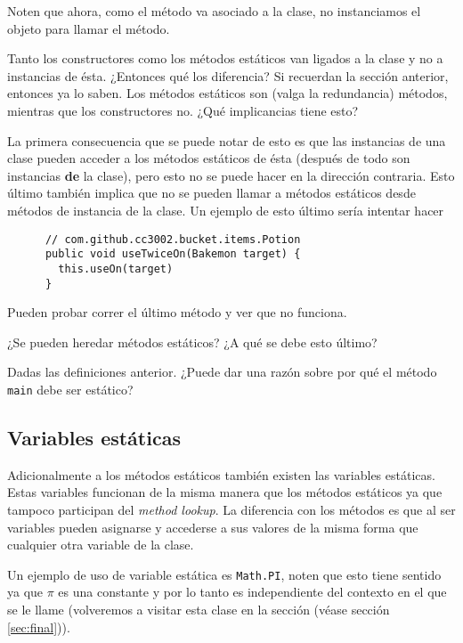     Noten que ahora, como el método va asociado a la clase, no instanciamos el objeto para llamar el
    método.
    
    Tanto los constructores como los métodos estáticos van ligados a la clase y no a instancias de
    ésta.
    ¿Entonces qué los diferencia?
    Si recuerdan la sección anterior, entonces ya lo saben.
    Los métodos estáticos son (valga la redundancia) métodos, mientras que los constructores no.
    ¿Qué implicancias tiene esto?

    La primera consecuencia que se puede notar de esto es que las instancias de una clase pueden
    acceder a los métodos estáticos de ésta (después de todo son instancias \textbf{de} la clase),
    pero esto no se puede hacer en la dirección contraria.
    Esto último también implica que no se pueden llamar a métodos estáticos desde métodos de 
    instancia de la clase.
    Un ejemplo de esto último sería intentar hacer
    
    \begin{verbatim}
      // com.github.cc3002.bucket.items.Potion
      public void useTwiceOn(Bakemon target) {
        this.useOn(target)
      }
    \end{verbatim}

    Pueden probar correr el último método y ver que no funciona.

    \begin{exercise}
      ¿Se pueden heredar métodos estáticos?
      ¿A qué se debe esto último?
    \end{exercise}
    
    \begin{exercise}
      Dadas las definiciones anterior. 
      ¿Puede dar una razón sobre por qué el método \texttt{main} debe ser estático?
    \end{exercise}
  \subsection{Variables estáticas}
    Adicionalmente a los métodos estáticos también existen las variables estáticas.
    Estas variables funcionan de la misma manera que los métodos estáticos ya que tampoco participan
    del \textit{method lookup}.
    La diferencia con los métodos es que al ser variables pueden asignarse y accederse a sus valores
    de la misma forma que cualquier otra variable de la clase.

    Un ejemplo de uso de variable estática es \texttt{Math.PI}, noten que esto tiene sentido ya que
    \(\pi\) es una constante y por lo tanto es independiente del contexto en el que se le llame 
    (volveremos a visitar esta clase en la sección (véase sección \ref{sec:final})).

